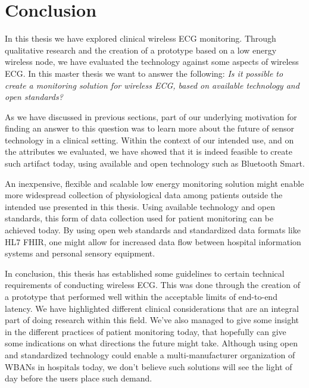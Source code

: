 \section{Conclusion} %
\label{sec:conclusion}

In this thesis we have explored clinical wireless ECG monitoring. Through qualitative research and the creation of a prototype based on a low energy wireless node, we have evaluated the technology against some aspects of wireless ECG. In this master thesis we want to answer the following: \textit{Is it possible to create a monitoring solution for wireless ECG, based on available technology and open standards?}

As we have discussed in previous sections, part of our underlying motivation for finding an answer to this question was to learn more about the future of sensor technology in a clinical setting. Within the context of our intended use, and on the attributes we evaluated, we have showed that it is indeed feasible to create such artifact today, using available and open technology such as Bluetooth Smart.

An inexpensive, flexible and scalable low energy monitoring solution might enable more widespread collection of physiological data among patients outside the intended use presented in this thesis. Using available technology and open standards, this form of data collection used for patient monitoring can be achieved today. By using open web standards and standardized data formats like HL7 FHIR, one might allow for increased data flow between hospital information systems and personal sensory equipment.

In conclusion, this thesis has established some guidelines to certain technical requirements of conducting wireless ECG. This was done through the creation of a prototype that performed well within the acceptable limits of end-to-end latency. We have highlighted different clinical considerations that are an integral part of doing research within this field. We've also managed to give some insight in the different practices of patient monitoring today, that hopefully can give some indications on what directions the future might take. Although using open and standardized technology could enable a multi-manufacturer organization of WBANs in hospitals today, we don't believe such solutions will see the light of day before the users place such demand.

